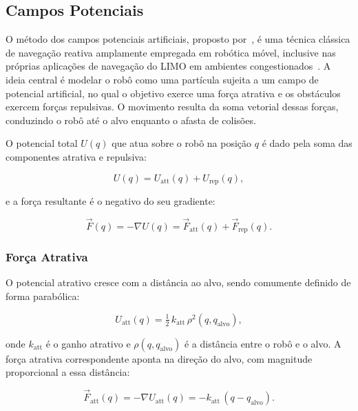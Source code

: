 \subsection{Campos Potenciais}
\label{sec:campos}

O método dos campos potenciais artificiais, proposto por~\cite{khatib1986potential},
é uma técnica clássica de navegação reativa amplamente empregada em robótica
móvel, inclusive nas próprias aplicações de navegação do LIMO em ambientes
congestionados~\cite{pimenta2024limo}. A ideia central é modelar o robô como uma
partícula sujeita a um campo de potencial artificial, no qual o objetivo exerce
uma força atrativa e os obstáculos exercem forças repulsivas. O
movimento resulta da soma vetorial dessas forças, conduzindo o robô até o alvo
enquanto o afasta de colisões.

O potencial total $U(q)$ que atua sobre o robô na posição $q$ é dado pela soma das
componentes atrativa e repulsiva:

\begin{equation}
  \label{eq:potencial}
  U(q) = U_{\text{att}}(q) + U_{\text{rep}}(q) ,
\end{equation}

e a força resultante é o negativo do seu gradiente:

\begin{equation}
  \vec{F}(q) = -\nabla U(q) = \vec{F}_{\text{att}}(q) + \vec{F}_{\text{rep}}(q) .
\end{equation}

\subsubsection{Força Atrativa}

O potencial atrativo cresce com a distância ao alvo, sendo comumente definido de
forma parabólica:

\begin{equation}
  U_{\text{att}}(q) = \tfrac{1}{2}\, k_{\text{att}}\, \rho^2(q, q_{\text{alvo}}) ,
\end{equation}

onde $k_{\text{att}}$ é o ganho atrativo e $\rho(q, q_{\text{alvo}})$ é a
distância entre o robô e o alvo. A força atrativa correspondente aponta na
direção do alvo, com magnitude proporcional a essa distância:

\begin{equation}
  \label{eq:fatrativa}
  \vec{F}_{\text{att}}(q) = -\nabla U_{\text{att}}(q)
  = -k_{\text{att}}\, (q - q_{\text{alvo}}) .
\end{equation}

